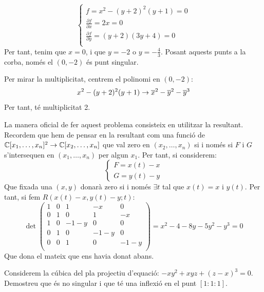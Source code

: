 \documentclass[11pt, a4paper]{article}
\begin{document}
\[
    \begin{cases*}
    f=x^2-(y+2)^2(y+1)=0\\
    \frac{\partial f}{\partial x}=2x=0\\
    \frac{\partial f}{\partial y}=(y+2)(3y+4)=0\\
    \end{cases*}
\]
Per tant, tenim que $x=0$, i que $y=-2$ o $y=-\frac{4}{3}$. Posant aquests punts a la corba, només el $(0,-2)$ és punt singular.\par
Per mirar la multiplicitat, centrem el polinomi en $(0,-2)$:
\[
    x^2-(y+2)^2(y+1)\to \overline x^2 - \overline y^2-\overline y^3
\]
Per tant, té multiplicitat 2.\par \vspace{20mm}
La manera oficial de fer aquest problema consisteix en utilitzar la resultant. Recordem que hem de pensar en la resultant com una funció de $\mathbb C[x_1,\dots,x_n]^2\to \mathbb C[x_2,\dots, x_n]$ que val zero en $(x_2,\dots, x_n)$ si i només si $F$ i $G$ s'intersequen en $(x_1,\dots,x_n)$ per algun $x_1$. Per tant, si considerem:
\[
    \begin{cases}
        F=x(t)-x\\
        G=y(t)-y
    \end{cases}
\]
Que fixada una $(x,y)$ donarà zero si i només $\exists t$ tal que $x(t)=x$ i $y(t)$. Per tant, si fem $R(x(t)-x,y(t)-y;t)$:
\[
    \det\begin{pmatrix}
        1 & 0 &    1 &   -x & 0\\
        0 & 1 &    0 &    1 & -x\\
        1 & 0 & -1-y &    0 & 0\\
        0 & 1 &    0 & -1-y & 0\\
        0 & 0 &    1 &    0 & -1-y\\
    \end{pmatrix}=x^2-4-8y-5y^2-y^3=0
\]
Que dona el mateix que ens havia donat abans.
\newpage
\begin{tcolorbox}[title=\section{Exercici 4}]
    Considerem la cúbica del pla projectiu d'equació: $-xy^2 + xyz + (z - x)^3=0$.\\
Demostreu que és no singular i que té una inflexió en el punt $[1 : 1 : 1]$.
\end{tcolorbox}
\end{document}
